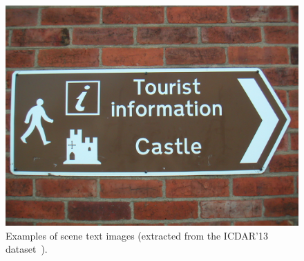\begin{figure}[h!]
    	\includegraphics[height=0.172\textheight]{dataset_samples/icdar13/img_83.jpg}
    	
    	\caption{Examples of scene text images (extracted from the ICDAR'13 dataset~\cite{Karatzas2013ICDAR}).}
    	\label{fig:sample_icdar13}
    \end{figure}
    
